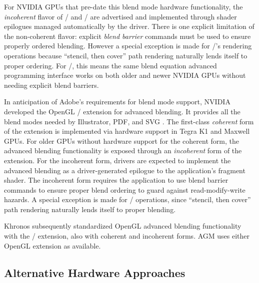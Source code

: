 For NVIDIA GPUs that pre-date
this blend mode hardware functionality, the {\em incoherent} flavor of \NVbea/ and \KHRbea/ are
advertised and implemented through shader epilogues managed automatically
by the driver.  There is one explicit limitation of the non-coherent flavor: explicit {\em blend barrier} commands
must be used to ensure properly ordered blending.  However a special
exception is made for \NVpr/'s rendering operations because ``stencil,
then cover'' path rendering naturally lends itself to proper ordering.
For \Illustrator/, this means the same blend equation advanced programming interface
works on both older and newer NVIDIA GPUs without needing explicit blend barriers.
\fi

In anticipation of Adobe's requirements for blend mode support, NVIDIA
developed the OpenGL \NVbea/ extension \cite{NVbeaSpec} for advanced blending.  It
provides
all the blend modes needed by Illustrator, PDF, and SVG \cite{SVG-Compositing-Spec}.
The first-class {\em coherent} form of the extension
is implemented via hardware support in Tegra K1 and Maxwell
GPUs.
For older GPUs without hardware support for the coherent form,
the advanced blending functionality is exposed
through an {\em incoherent} form of the extension.
For the incoherent form, drivers 
are expected to implement the advanced blending as
a driver-generated epilogue to the application's fragment shader.
The incoherent form
requires the application to use
blend barrier commands to ensure proper blend ordering
to guard against read-modify-write hazards.
A special exception is made for \NVpr/
operations, since ``stencil, then cover'' path rendering naturally lends
itself to proper blending.

Khronos subsequently standardized OpenGL advanced blending functionality with the \KHRbea/
\cite{KHRbeaSpec} extension, also with coherent and incoherent forms.
AGM uses either OpenGL extension as available.


\ifdefined\NOSHOW
\subsection{Alternative Hardware Approaches}
\label{sec:blendalternatives}

